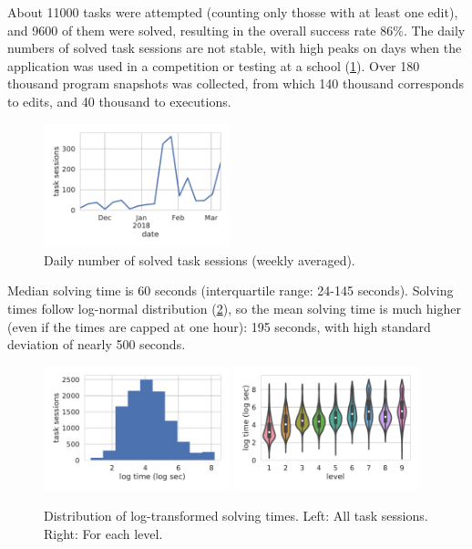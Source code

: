 About 11000 tasks were attempted (counting only thosse with at least one edit),
and 9600 of them were solved,
resulting in the overall success rate $86\%$.
The daily numbers of solved task sessions are not stable,
with high peaks on days when the application was used
in a competition or testing at a school
(\cref{fig:daily-task-sessions}).
Over 180 thousand program snapshots was collected,
from which 140 thousand corresponds to edits,
and 40 thousand to executions.

\begin{figure}[htb]
\centering
\includegraphics[width=0.48\textwidth,trim={0 21mm 0 7mm},clip]{img/daily-task-sessions}
\caption{Daily number of solved task sessions (weekly averaged).}
\label{fig:daily-task-sessions}
\end{figure}

Median solving time is 60 seconds (interquartile range: 24-145 seconds).
Solving times follow log-normal distribution (\cref{fig:solving-times}),
so the mean solving time is much higher (even if the times are capped at one hour):
195 seconds, with high standard deviation of nearly 500 seconds.


\begin{figure}[htb]
\centering
\includegraphics[width=0.48\textwidth]{img/task-sessions-time-log}
\includegraphics[width=0.48\textwidth]{img/levels-time}
\caption{%
  Distribution of log-transformed solving times.
  Left: All task sessions.
  Right: For each level.}
\label{fig:solving-times}
\end{figure}

